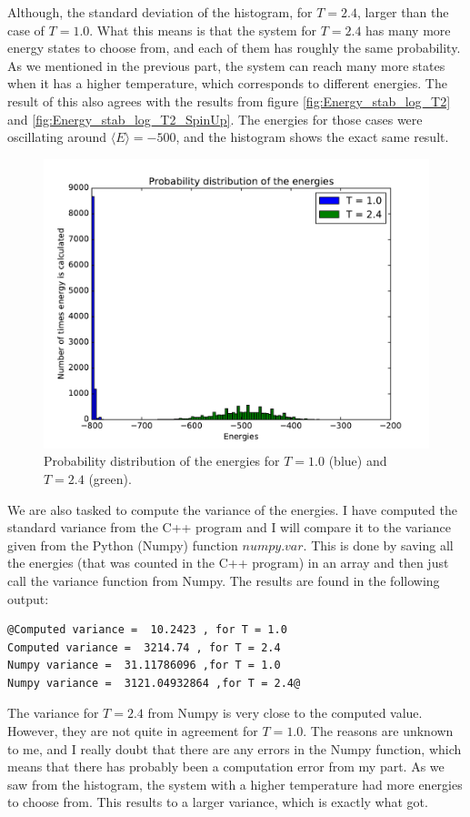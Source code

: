 \documentclass[12pt]{article}
\begin{document}
Although, the standard deviation of the histogram, for $T=2.4$, larger than the case of $T=1.0$. What this means is that the system for $T=2.4$ has many more energy states to choose from, and each of them has roughly the same probability. As we mentioned in the previous part, the system can reach many more states when it has a higher temperature, which corresponds to different energies. The result of this also agrees with the results from figure \ref{fig:Energy_stab_log_T2} and \ref{fig:Energy_stab_log_T2_SpinUp}. The energies for those cases were oscillating around $\langle E \rangle = -500$, and the histogram shows the exact same result.
\begin{figure}[H]
\centering
\includegraphics[width=\linewidth]{Plots/Probability_distribution_merged.pdf}
\caption{Probability distribution of the energies for $T=1.0$ (blue) and $T=2.4$ (green).}
\label{fig:prob_dist_merged}
\end{figure}
We are also tasked to compute the variance of the energies. I have computed the standard variance from the C++ program and I will compare it to the variance given from the Python (Numpy) function $numpy.var$. This is done by saving all the energies (that was counted in the C++ program) in an array and then just call the variance function from Numpy. The results are found in the following output:
\begin{lstlisting}
@Computed variance =  10.2423 , for T = 1.0
Computed variance =  3214.74 , for T = 2.4
Numpy variance =  31.11786096 ,for T = 1.0
Numpy variance =  3121.04932864 ,for T = 2.4@
\end{lstlisting}
The variance for $T=2.4$ from Numpy is very close to the computed value. However, they are not quite in agreement for $T=1.0$. The reasons are unknown to me, and I really doubt that there are any errors in the Numpy function, which means that there has probably been a computation error from my part. As we saw from the histogram, the system with a higher temperature had more energies to choose from. This results to a larger variance, which is exactly what got.
\end{document}
